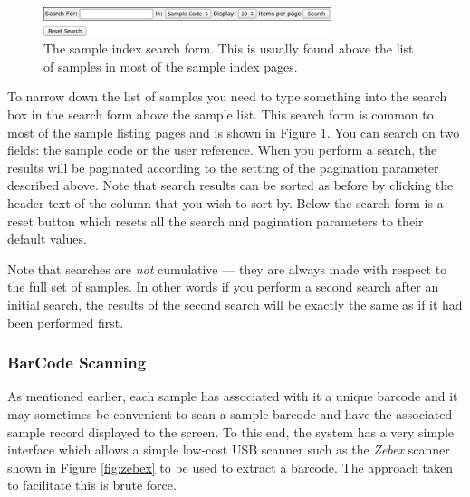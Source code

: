 \documentclass[12pt,twoside]{article}
\begin{document}
\begin{figure}[!h]
\begin{center}
\includegraphics[width=0.75\textwidth]{searchform}
\caption{The sample index search form. This is usually found
above the list of samples in most of the sample index pages.
\label{fig:searchform}}
\end{center}
\end{figure}

To narrow down the list of samples you need to type something into
the search box in the search form above the sample list. This search form
is common to most of the sample listing pages and is shown in
Figure \ref{fig:searchform}.
You can search
on two fields: the sample code or the user reference. When you perform
a search, the results will be paginated according to the setting of the
pagination parameter described above. Note that search results can be
sorted as before by clicking the header text of the column that you
wish to sort by.
Below the search form is a reset button which resets all the search
and pagination parameters to their default values.

\begin{plainblock}
Note that searches are \emph{not} cumulative --- they are always made
with respect to the full set of samples. In other words if you perform
a second search after an initial search, the results of the second search
will be exactly the same as if it had been performed first.
\end{plainblock}

\subsubsection{BarCode Scanning}
As mentioned earlier, each sample has associated with it a unique
barcode and it may sometimes be convenient to scan a sample barcode
and have the associated sample record displayed to the screen.
To this end, the system has a very simple interface which allows
a simple low-cost USB scanner such as the \emph{Zebex} scanner shown in 
Figure \ref{fig:zebex} to be used to extract a barcode.
The approach taken to facilitate this is brute force.
\end{document}

